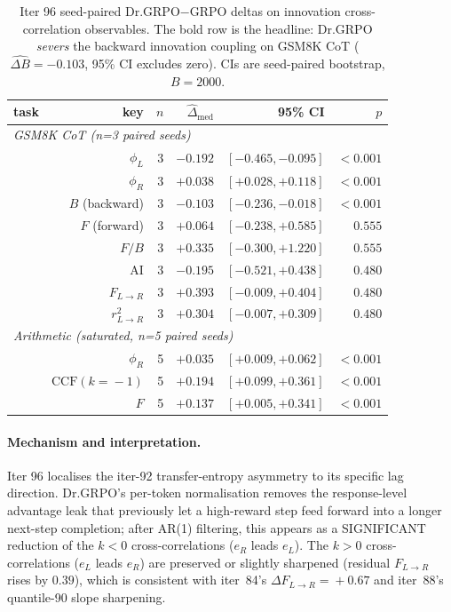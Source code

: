 \begin{table}[t]
\centering\small
\begin{tabular}{lrrrrr}
\hline
task & key & $n$ & $\widehat{\Delta}_{\mathrm{med}}$ & 95\% CI & $p$ \\
\hline
\multicolumn{6}{l}{\emph{GSM8K CoT (n=3 paired seeds)}} \\
          & $\phi_L$      & 3 & $-0.192$ & $[-0.465, -0.095]$ & $<0.001$\\
          & $\phi_R$      & 3 & $+0.038$ & $[+0.028, +0.118]$ & $<0.001$\\
          & $B$ (backward) & 3 & $\mathbf{-0.103}$ & $\mathbf{[-0.236, -0.018]}$ & $\mathbf{<0.001}$\\
          & $F$ (forward) & 3 & $+0.064$ & $[-0.238, +0.585]$ & $0.555$\\
          & $F/B$         & 3 & $+0.335$ & $[-0.300, +1.220]$ & $0.555$\\
          & AI            & 3 & $-0.195$ & $[-0.521, +0.438]$ & $0.480$\\
          & $F_{L\to R}$  & 3 & $+0.393$ & $[-0.009, +0.404]$ & $0.480$\\
          & $r^2_{L\to R}$& 3 & $+0.304$ & $[-0.007, +0.309]$ & $0.480$\\
\multicolumn{6}{l}{\emph{Arithmetic (saturated, n=5 paired seeds)}} \\
          & $\phi_R$      & 5 & $+0.035$ & $[+0.009, +0.062]$ & $<0.001$\\
          & $\mathrm{CCF}(k\!=\!-1)$ & 5 & $+0.194$ & $[+0.099, +0.361]$ & $<0.001$\\
          & $F$           & 5 & $+0.137$ & $[+0.005, +0.341]$ & $<0.001$\\
\hline
\end{tabular}
\caption{Iter 96 seed-paired Dr.GRPO$-$GRPO deltas on innovation
cross-correlation observables. The bold row is the headline:
Dr.GRPO \emph{severs} the backward innovation coupling on GSM8K CoT
($\widehat{\Delta B}=-0.103$, 95\% CI excludes zero).  CIs are
seed-paired bootstrap, $B\!=\!2000$.}\label{tab:lb-iter96-paired}
\end{table}

\paragraph{Mechanism and interpretation.}  Iter 96 localises the
iter-92 transfer-entropy asymmetry to its specific lag direction.
Dr.GRPO's per-token normalisation removes the response-level
advantage leak that previously let a high-reward step feed forward
into a longer next-step completion; after AR(1) filtering, this
appears as a SIGNIFICANT reduction of the $k<0$ cross-correlations
($e_R$ leads $e_L$).  The $k>0$ cross-correlations ($e_L$ leads
$e_R$) are preserved or slightly sharpened (residual $F_{L\to R}$
rises by $0.39$), which is consistent with iter~84's
$\Delta F_{L\to R}\!=\!+0.67$ and iter~88's quantile-90 slope
sharpening.

